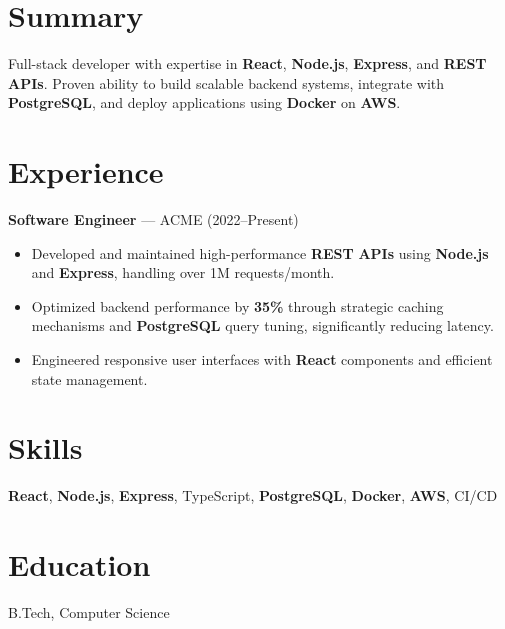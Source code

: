 \documentclass{article}
\begin{document}

\section*{Summary}
Full-stack developer with expertise in \textbf{React}, \textbf{Node.js}, \textbf{Express}, and \textbf{REST} \textbf{APIs}. Proven ability to build scalable backend systems, integrate with \textbf{PostgreSQL}, and deploy applications using \textbf{Docker} on \textbf{AWS}.

\section*{Experience}
\textbf{Software Engineer} — ACME (2022--Present)\\
\begin{itemize}
    \item Developed and maintained high-performance \textbf{REST} \textbf{APIs} using \textbf{Node.js} and \textbf{Express}, handling over 1M requests/month.
    \item Optimized backend performance by \textbf{35\%} through strategic caching mechanisms and \textbf{PostgreSQL} query tuning, significantly reducing latency.
    \item Engineered responsive user interfaces with \textbf{React} components and efficient state management.
\end{itemize}

\section*{Skills}
\textbf{React}, \textbf{Node.js}, \textbf{Express}, TypeScript, \textbf{PostgreSQL}, \textbf{Docker}, \textbf{AWS}, CI/CD

\section*{Education}
B.Tech, Computer Science
\end{document}
